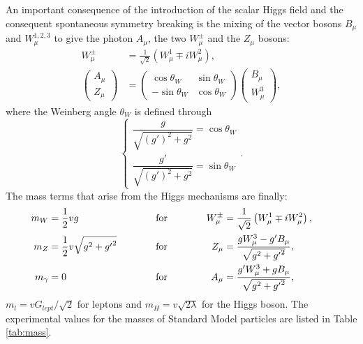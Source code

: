An important consequence of the introduction of the scalar Higgs 
field and the consequent spontaneous symmetry breaking
is the mixing of the vector bosons $B_{\mu}$ and $W^{1,2,3}_{\mu}$ 
to give the photon $A_{\mu}$, the two $W^{\pm}_{\mu}$ and 
the $Z_{\mu}$ bosons:
\begin{align}
  W_{\mu}^{\pm} & = \frac{1}{\sqrt{2}}\left(W_{\mu}^{1}\mp i W_{\mu}^{2}\right), \label{eq:Wpm} \\
  \left(
  \begin{array}{c}
  A_{\mu} \\ Z_{\mu}
  \end{array}
  \right)
  & =
  \left(
  \begin{array}{cc}
  \cos\theta_{W} & \sin\theta_{W} \\
  -\sin\theta_{W} & \cos\theta_{W}
  \end{array}
  \right)
  \left(
  \begin{array}{c}
  B_{\mu} \\ W_{\mu}^{3}
  \end{array}
  \right) , \label{eq:AZ}
\end{align}
where the Weinberg angle $\theta_{W}$ is defined through\begin{equation}\label{eq:weinb}
\left \{ \begin{array}{ll}
\dfrac{g}{\sqrt{(g')^{2}+g^{2}}} = \cos\theta_{W} \\
\dfrac{g'}{\sqrt{(g')^{2}+g^{2}}} = \sin\theta_{W} \end{array}\right. .
\end{equation} 
The mass terms that arise from the Higgs mechanisms are finally:
\begin{align}
  m_W & =  \dfrac{1}{2}vg \quad \quad \quad & \textnormal{for} & \quad \quad \quad
  & W^{\pm}_{\mu} & = \dfrac{1}{\sqrt{2}}\left(W^{1}_{\mu} \mp i W^{2}_{\mu}\right), \quad & \\
  m_Z & =  \dfrac{1}{2}v\sqrt{g^{2}+{g'}^{2}}
  \quad \quad \quad & \textnormal{for} & \quad \quad \quad
  & Z_{\mu} & = \dfrac{gW^{3}_{\mu} - g'B_{\mu}}{\sqrt{g^{2}+{g'}^{2}}}, \quad & \\
  m_{\gamma} & =  0
  \quad \quad \quad & \textnormal{for} & \quad \quad \quad
  & A_{\mu} & = \dfrac{g'W^{3}_{\mu} + gB_{\mu}}{\sqrt{g^{2}+{g'}^{2}}}, \quad & 
\end{align}
$m_l = v G_{lept}/\sqrt{2}$ for leptons and $m_H = v\sqrt{2\lambda}$ for the Higgs boson. 
The experimental values for the masses of Standard Model particles
are listed in Table \ref{tab:mass}.


